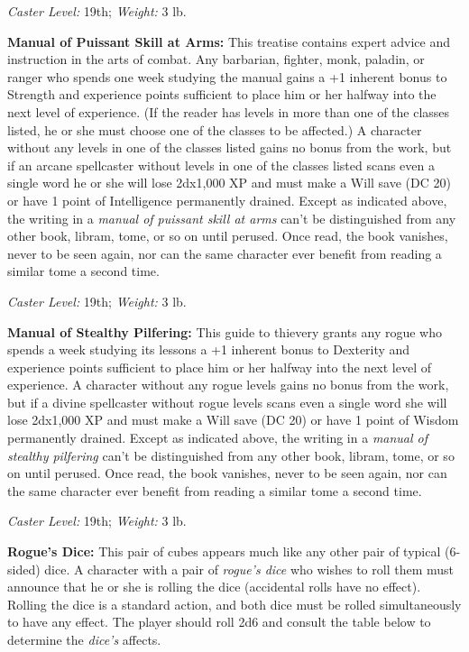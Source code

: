\documentclass{article}
\begin{document}
\textit{Caster Level: }19th; \textit{Weight: }3 lb. 

\textbf{Manual of Puissant Skill at Arms: }This treatise contains expert advice 
and instruction in the arts of combat. Any barbarian, fighter, monk, paladin, or 
ranger who spends one week studying the manual gains a +1 inherent bonus to Strength 
and experience points sufficient to place him or her halfway into the next level 
of experience. (If the reader has levels in more than one of the classes listed, 
he or she must choose one of the classes to be affected.) A character without any 
levels in one of the classes listed gains no bonus from the work, but if an arcane 
spellcaster without levels in one of the classes listed scans even a single word 
he or she will lose 2dx1,000 XP and must make a Will save (DC 20) or have 1 point 
of Intelligence permanently drained. Except as indicated above, the writing in 
a \textit{manual of puissant skill at arms }can't be distinguished from any other 
book, libram, tome, or so on until perused. Once read, the book vanishes, never 
to be seen again, nor can the same character ever benefit from reading a similar 
tome a second time. 

\textit{Caster Level: }19th; \textit{Weight: }3 lb. 

\textbf{Manual of Stealthy Pilfering: }This guide to thievery grants any rogue 
who spends a week studying its lessons a +1 inherent bonus to Dexterity and experience 
points sufficient to place him or her halfway into the next level of experience. 
A character without any rogue levels gains no bonus from the work, but if a divine 
spellcaster without rogue levels scans even a single word she will lose 2dx1,000 
XP and must make a Will save (DC 20) or have 1 point of Wisdom permanently drained. 
Except as indicated above, the writing in a \textit{manual of stealthy pilfering 
}can't be distinguished from any other book, libram, tome, or so on until perused. 
Once read, the book vanishes, never to be seen again, nor can the same character 
ever benefit from reading a similar tome a second time. 

\textit{Caster Level: }19th; \textit{Weight: }3 lb. 

\textbf{Rogue's Dice: }This pair of cubes appears much like any other pair of typical 
(6-sided) dice. A character with a pair of \textit{rogue's dice }who wishes to 
roll them must announce that he or she is rolling the dice (accidental rolls have 
no effect). Rolling the dice is a standard action, and both dice must be rolled 
simultaneously to have any effect. The player should roll 2d6 and consult the table 
below to determine the \textit{dice's }affects. 
\end{document}
